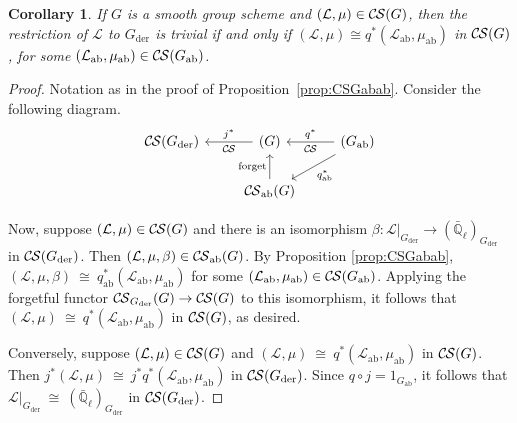 \documentclass[10pt]{amsart}
\theoremstyle{plain}
\newtheorem{corollary}[theorem]{Corollary}
\theoremstyle{definition}
\newcommand{\EE}{\mathbb{\bar Q}_\ell}
\newcommand{\der}{_{\operatorname{der}}}
\newcommand{\ab}{_{\operatorname{ab}}}
\newcommand{\iso}{{\ \cong\ }}
\newcommand{\cs}[1]{{\mathcal{#1}}}
\newcommand{\CS}{{\mathcal{C\hskip-0.8pt S}}}
\newcommand{\CSab}{\CS_{\operatorname{ab}}}
\begin{document}
\begin{corollary} 
If $G$ is a smooth group scheme and $(\cs{L},\mu) \in \CS(G)$, then
the restriction of $\cs{L}$ to $G\der$ is trivial if and only if $(\cs{L},\mu) \cong q^*(\cs{L}\ab,\mu\ab)$ in $\CS(G)$, for some $(\cs{L}\ab,\mu\ab) \in \CS(G\ab)$. 
\end{corollary}

\begin{proof}
Notation as in the proof of Proposition~\ref{prop:CSGabab}.
Consider the following diagram.
\[
\begin{tikzcd}
\CS(G\der) & \arrow{l}[swap]{j^*} \CS(G) &\arrow{l}[swap]{q^*} 
\CS(G\ab) \arrow{dl}{q\ab^*} \\
& \CSab(G) \arrow{u}{\text{forget}}  & 
\end{tikzcd}
\]

Now, suppose $(\cs{L},\mu)\in \CS(G)$ and there is an isomorphism $\beta : \cs{L}\vert_{G\der} \to (\EE)_{G\der}$ in $\CS(G\der)$.
Then $(\cs{L},\mu,\beta) \in \CSab(G)$.
By Proposition \ref{prop:CSGabab}, $(\cs{L},\mu,\beta) \iso q\ab^*(\cs{L}\ab,\mu\ab)$ for some $(\cs{L}\ab,\mu\ab)\in \CS(G\ab)$.
Applying the forgetful functor $\CS_{G\der}(G)\to \CS(G)$ to this isomorphism, it follows that $(\cs{L},\mu) \iso q^*(\cs{L}\ab,\mu\ab)$ in $\CS(G)$, as desired. 

Conversely, suppose $(\cs{L},\mu)\in \CS(G)$ and $(\cs{L},\mu) \iso q^*(\cs{L}\ab,\mu\ab)$ in $\CS(G)$.
Then $j^*(\cs{L},\mu) \iso j^*q^*(\cs{L}\ab,\mu\ab)$ in $\CS(G\der)$. 
Since $q\circ j = 1_{G\ab}$, it follows that $\cs{L}\vert_{G\der} \iso (\EE)_{G\der}$ in $\CS(G\der)$.
\end{proof}
\end{document}
